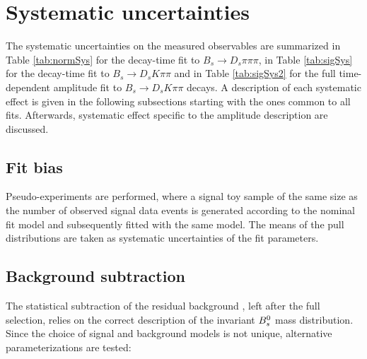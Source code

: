 \section{Systematic uncertainties}
\label{sec:Systematics}

The systematic uncertainties on the measured observables are summarized in Table \ref{tab:normSys} for the decay-time fit to $B_s \to D_s \pi\pi\pi$,
in Table \ref{tab:sigSys} for the decay-time fit to $B_s \to D_s K\pi\pi$
and in Table \ref{tab:sigSys2} for the full time-dependent amplitude fit to $B_s \to D_s K\pi\pi$ decays.
A description of each systematic
effect is given in the following subsections
starting with the ones common to all fits.
Afterwards, systematic effect specific to the amplitude description are discussed.


\subsection{Fit bias}
\label{subsec:SystFit}

Pseudo-experiments are performed, where a signal toy sample of the same size as the number of observed signal data events is generated according to the nominal fit model 
and subsequently fitted with the same model.
The means of the pull distributions are taken as systematic uncertainties of the fit parameters.

\subsection{Background subtraction}
\label{subsec:SystMass}

The statistical subtraction of the residual background \cite{Pivk:2004ty}, left after the full selection, relies on the correct description of the invariant ${{B}^0_{s}}$ mass distribution.
Since the choice of signal and background models is not unique, alternative parameterizations are tested:

